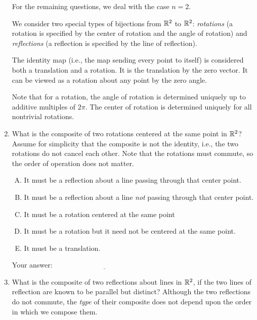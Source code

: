 \documentclass[10pt]{amsart}
\begin{document}
\begin{enumerate}
  For the remaining questions, we deal with the case $n = 2$.

  We consider two special types of bijections from $\mathbb{R}^2$ to $\mathbb{R}^2$:
  {\em rotations} (a rotation is specified by the center of rotation
  and the angle of rotation) and {\em reflections} (a reflection is
  specified by the line of reflection).
  
  The identity map (i.e., the map sending every point to itself) is
  considered both a translation and a rotation. It is the translation
  by the zero vector. It can be viewed as a rotation about any point
  by the zero angle.

  Note that for a rotation, the angle of rotation is determined
  uniquely up to additive multiples of $2\pi$. The center of rotation
  is determined uniquely for all nontrivial rotations.

 \item What is the composite of two rotations centered at the same
   point in $\mathbb{R}^2$? Assume for simplicity that the composite is not the
   identity, i.e., the two rotations do not cancel each other. Note
   that the rotations must commute, so the order of operation does
   not matter.

   \begin{enumerate}[(A)]
   \item It must be a reflection about a line passing through that center point.
   \item It must be a reflection about a line {\em not} passing through
     that center point.
   \item It must be a rotation centered at the same point
   \item It must be a rotation but it need not be centered at the same point.
   \item It must be a translation.
   \end{enumerate}

   \vspace{0.1in}
   Your answer: $\underline{\qquad\qquad\qquad\qquad\qquad\qquad\qquad}$
   \vspace{0.1in}

 \item What is the composite of two reflections about lines in $\mathbb{R}^2$,
   if the two lines of reflection are known to be parallel but
   distinct? Although the two reflections do not commute, the {\em
     type} of their composite does not depend upon the order in which
   we compose them.


\end{enumerate}
\end{document}
